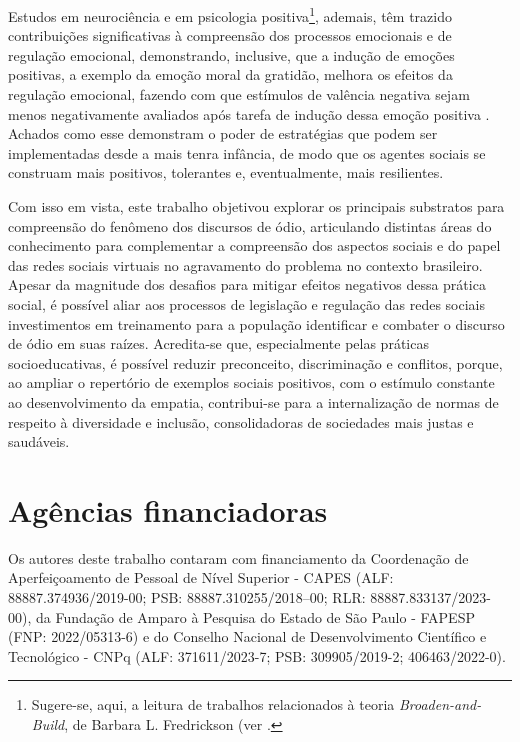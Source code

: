 \documentclass[portuguese]{textolivre}
\begin{document}
Estudos em neurociência e em psicologia positiva\footnote{Sugere-se, aqui, a leitura de trabalhos relacionados à teoria \emph{Broaden-and-Build}, de Barbara L. Fredrickson (ver \textcite{fredrickson1998good, fredrickson2013positive, fredrickson2003good}.}, ademais, têm trazido contribuições significativas à compreensão dos processos emocionais e de regulação emocional, demonstrando, inclusive, que a indução de emoções positivas, a exemplo da emoção moral da gratidão, melhora os efeitos da regulação emocional, fazendo com que estímulos de valência negativa sejam menos negativamente avaliados após tarefa de indução dessa emoção positiva \cite{boggio2020writing}. Achados como esse demonstram o poder de estratégias que podem ser implementadas desde a mais tenra infância, de modo que os agentes sociais se construam mais positivos, tolerantes e, eventualmente, mais resilientes.

Com isso em vista, este trabalho objetivou explorar os principais substratos para compreensão do fenômeno dos discursos de ódio, articulando distintas áreas do conhecimento para complementar a compreensão dos aspectos sociais e do papel das redes sociais virtuais no agravamento do problema no contexto brasileiro. Apesar da magnitude dos desafios para mitigar efeitos negativos dessa prática social, é possível aliar aos processos de legislação e regulação das redes sociais investimentos em treinamento para a população identificar e combater o discurso de ódio em suas raízes. Acredita-se que, especialmente pelas práticas socioeducativas, é possível reduzir preconceito, discriminação e conflitos, porque, ao ampliar o repertório de exemplos sociais positivos, com o estímulo constante ao desenvolvimento da empatia, contribui-se para a internalização de normas de respeito à diversidade e inclusão, consolidadoras de sociedades mais justas e saudáveis.

\section{Agências financiadoras}


Os autores deste trabalho contaram com financiamento da Coordenação de Aperfeiçoamento de Pessoal de Nível Superior - CAPES (ALF: 88887.374936/2019-00; PSB: 88887.310255/2018–00; RLR: 88887.833137/2023-00), da Fundação de Amparo à Pesquisa do Estado de São Paulo - FAPESP (FNP: 2022/05313-6) e do Conselho Nacional de Desenvolvimento Científico e Tecnológico - CNPq (ALF: 371611/2023-7; PSB: 309905/2019-2; 406463/2022-0).
\end{document}
